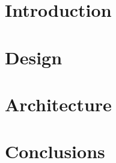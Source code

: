 \documentclass[10pt]{article}
\begin{document}

\restoregeometry

\setcounter{tocdepth}{5}
\tableofcontents
\listoffigures
\listoftables
\pagebreak

\justify

\section{Introduction}

\pagebreak

\section{Design}

\pagebreak

\section{Architecture}

\pagebreak

\section{Conclusions}

\pagebreak

\printbibliography
\end{document}
